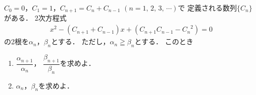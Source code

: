 \documentclass[../../main.tex]{subfiles}
\begin{document}
$C_0=0$，$C_1=1$，$C_{n+1}=C_n+C_{n-1}$ $(n=1, \, 2, \, 3, \, \cdots)$で
定義される数列$\{ C_n \}$がある．
2次方程式
\begin{align}
  x^2-(C_{n+1}+C_{n-1})x+(C_{n+1}C_{n-1}-{C_n}^2)=0
\end{align}
の2根を$\alpha_n$，$\beta_n$とする．
ただし，$\alpha_n\geqq\beta_n$とする．
このとき
\begin{enumerate}
  \item $\displaystyle\dfrac{\alpha_{n+1}}{\alpha_n}$，
    $\displaystyle\dfrac{\beta_{n+1}}{\beta_n}$を求めよ．
  \item $\alpha_n$，$\beta_n$を求めよ．
\end{enumerate}
\end{document}

